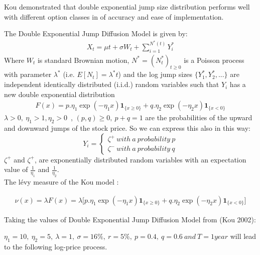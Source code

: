 \documentclass[12pt]{report}
\begin{document}
Kou demonstrated that double exponential jump size distribution performs well with different option classes  in  of accuracy and ease of implementation.

The Double Exponential Jump Diffusion Model is given by: 
\begin{gather}
X_t = \mu t+\sigma W_t+\sum_{i=1}^{N^*(t)} Y^*_i
\end{gather}
Where $W_t$ is  standard Brownian motion, $N^* =(N^*_t)_{t \geqslant 0}$ is a Poisson process with parameter $\lambda^*$ (i.e. $E[N_t] = \lambda^* t$) and the log jump sizes $\{Y^*_1 , Y^*_2 , ... \}$ are
independent identically distributed (i.i.d.) random variables such that $Y_i$ has a new double exponential distribution 
\begin{gather}
F(x)= p.\eta_1 \exp \left( -\eta_1 x \right) \mathbf{1}_{\{x\geqslant 0\}}+ q .\eta_2 \exp \left( -\eta_2 x \right) \mathbf{1}_{\{x < 0\}}
\end{gather}
$\lambda > 0,~ \eta_1 > 1, \eta_2 > 0$~,  
$(p,q) \geqslant 0,~ p+q=1$ are the probabilities of the upward and downward jumps of the stock price. So we can
express this also in this way:\\

         \[Y_i = \begin{cases} 
  \zeta^+ ~ with~ a~ probability ~ p \\
         \zeta^-  ~with ~ a ~ probability ~ q
         \end{cases}
          \]
$\zeta^+$ and $\zeta^+$, are exponentially distributed random variables with an expectation value of $\frac{1}{\eta_1}$ and $\frac{1}{\eta_2}$.\\

The lévy measure of the Kou model :

\begin{gather}
 \nu(x)=\lambda F(x)=\lambda \big[ p.\eta_1 \exp \left( -\eta_1 x \right) \mathbf{1}_{\{x\geqslant 0\}}+ q .\eta_2 \exp \left( -\eta_2 x \right) \mathbf{1}_{\{x < 0\}}\big]
\end{gather}

Taking the values of Double Exponential Jump Diffusion Model  from (Kou 2002):

$ \eta_1= 10,~\eta_2= 5,~\lambda=1,~\sigma= 16\%,~r=5\%,~ p=0.4,~ q=0.6 ~ and ~T=1 year $ will lead to the following log-price process.
\end{document}
